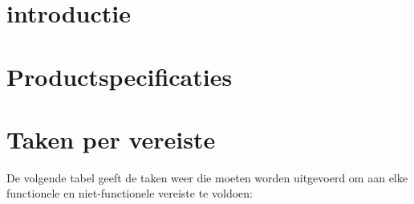 \section{introductie}


\section{Productspecificaties}



\section{Taken per vereiste}
De volgende tabel geeft de taken weer die moeten worden uitgevoerd om aan elke functionele en niet-functionele vereiste te voldoen:

